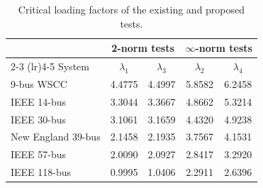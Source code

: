 \begin{table}[!t]
\caption{Critical loading factors of the existing and proposed tests.}
\label{tab:critical_loading_factors}
\centering\footnotesize
\setlength{\tabcolsep}{2pt}
\renewcommand{\arraystretch}{1.20}
\begin{tabular*}{\columnwidth}{@{\extracolsep{\fill}}lcccc@{}}
\toprule
& \multicolumn{2}{c}{2-norm tests} & \multicolumn{2}{c}{$\infty$-norm tests} \\
\cmidrule(lr){2-3}
\cmidrule(lr){4-5}
System & $\lambda_1$ & $\lambda_3$ & $\lambda_2$ & $\lambda_4$ \\
\midrule
9-bus WSCC & 4.4775 & 4.4997 & 5.8582 & 6.2458 \\
IEEE 14-bus & 3.3044 & 3.3667 & 4.8662 & 5.3214 \\
IEEE 30-bus & 3.1061 & 3.1659 & 4.4320 & 4.9238 \\
New England 39-bus & 2.1458 & 2.1935 & 3.7567 & 4.1531 \\
IEEE 57-bus & 2.0090 & 2.0927 & 2.8417 & 3.2920 \\
IEEE 118-bus & 0.9995 & 1.0406 & 2.2911 & 2.6396 \\
\bottomrule
\end{tabular*}
\end{table}

